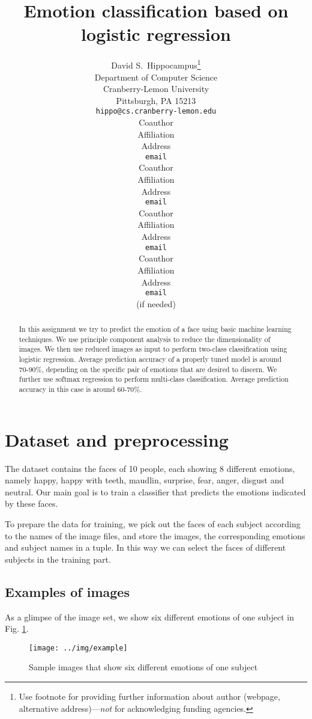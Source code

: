 \documentclass{article} %
\title{Emotion classification based on logistic regression}
\author{
David S.~Hippocampus\thanks{ Use footnote for providing further information
about author (webpage, alternative address)---\emph{not} for acknowledging
funding agencies.} \\
Department of Computer Science\\
Cranberry-Lemon University\\
Pittsburgh, PA 15213 \\
\texttt{hippo@cs.cranberry-lemon.edu} \\
\And
Coauthor \\
Affiliation \\
Address \\
\texttt{email} \\
\AND
Coauthor \\
Affiliation \\
Address \\
\texttt{email} \\
\And
Coauthor \\
Affiliation \\
Address \\
\texttt{email} \\
\And
Coauthor \\
Affiliation \\
Address \\
\texttt{email} \\
(if needed)\\
}
\begin{document}
\maketitle

\begin{abstract}
In this assignment we try to predict the emotion of a face using basic machine learning techniques. We use principle component analysis to reduce the dimensionality of images. We then use reduced images as input to perform two-class classification using logistic regression. Average  prediction accuracy of a properly tuned model is around 70-90\%, depending on the specific pair of emotions that are desired to discern. We further use softmax regression to perform multi-class classification. Average prediction accuracy in this case is around 60-70\%. 
\end{abstract}

\section{Dataset and preprocessing}
The dataset contains the faces of 10 people, each showing 8 different emotions, namely happy, happy with teeth, maudlin, surprise, fear, anger, disgust and neutral. Our main goal is to train a classifier that predicts the emotions indicated by these faces.

To prepare the data for training, we pick out the faces of each subject according to the names of the image files, and store the images, the corresponding emotions and subject names in a tuple. In  this way we can select the faces of different subjects in the training part. 

\subsection{Examples of images}
As a glimpse of the image set, we show six different emotions of one subject in Fig. \ref{fig:example}.

\begin{figure}[h]
\centering
\texttt{[image: ../img/example]}
\caption{Sample images that show six different emotions of one subject}
\label{fig:example}
\end{figure}
\end{document}
